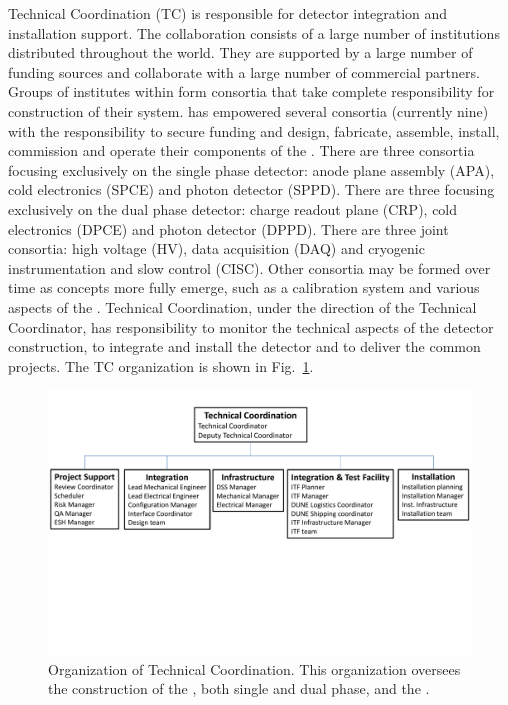 Technical Coordination (TC) is responsible for detector integration
and installation support. 
The  collaboration consists of a large number of
institutions distributed throughout the world. They are supported by a
large number of funding sources and collaborate with a large number of
commercial partners. Groups of institutes within  form
consortia that take complete responsibility for construction of their
system.   has empowered several consortia (currently nine)
with the responsibility to secure funding and design, fabricate,
assemble, install, commission and operate their components of the
 . There are three consortia focusing
exclusively on the single phase detector: anode plane assembly (APA),
cold electronics (SPCE) and photon detector (SPPD). There are three
focusing exclusively on the dual phase detector: charge readout plane
(CRP), cold electronics (DPCE) and photon detector (DPPD). There are
three joint consortia: high voltage (HV), data acquisition (DAQ) and
cryogenic instrumentation and slow control (CISC). Other consortia may
be formed over time as concepts more fully emerge, such as a
 calibration system and various aspects of the .
 Technical Coordination, under the direction of the
 Technical Coordinator, has responsibility to monitor the
technical aspects of the detector construction, to integrate and
install the detector and to deliver the common projects. The
 TC organization is shown in Fig.~\ref{fig:TC_orgchart}.
\begin{figure}[htb]
  \begin{center}
    \includegraphics[width=\textwidth]{far-detector-generic/figures/TP_TC_Org_Chart}
    \caption{Organization of Technical Coordination. This organization
      oversees the construction of the , both single and
      dual phase, and the .}
    \label{fig:TC_orgchart}
  \end{center}
\end{figure}
